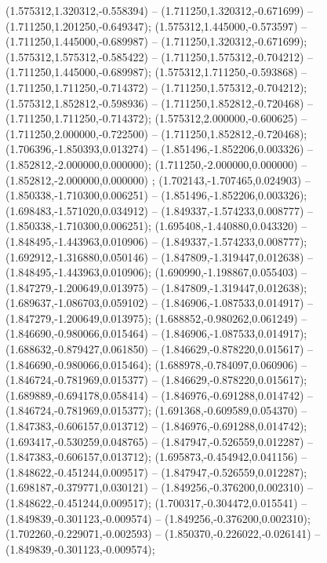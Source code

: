  (1.575312,1.320312,-0.558394) -- (1.711250,1.320312,-0.671699) -- (1.711250,1.201250,-0.649347);
 (1.575312,1.445000,-0.573597) -- (1.711250,1.445000,-0.689987) -- (1.711250,1.320312,-0.671699);
 (1.575312,1.575312,-0.585422) -- (1.711250,1.575312,-0.704212) -- (1.711250,1.445000,-0.689987);
 (1.575312,1.711250,-0.593868) -- (1.711250,1.711250,-0.714372) -- (1.711250,1.575312,-0.704212);
 (1.575312,1.852812,-0.598936) -- (1.711250,1.852812,-0.720468) -- (1.711250,1.711250,-0.714372);
 (1.575312,2.000000,-0.600625) -- (1.711250,2.000000,-0.722500) -- (1.711250,1.852812,-0.720468);
 (1.706396,-1.850393,0.013274) -- (1.851496,-1.852206,0.003326) -- (1.852812,-2.000000,0.000000);
 (1.711250,-2.000000,0.000000) -- (1.852812,-2.000000,0.000000) ;
 (1.702143,-1.707465,0.024903) -- (1.850338,-1.710300,0.006251) -- (1.851496,-1.852206,0.003326);
 (1.698483,-1.571020,0.034912) -- (1.849337,-1.574233,0.008777) -- (1.850338,-1.710300,0.006251);
 (1.695408,-1.440880,0.043320) -- (1.848495,-1.443963,0.010906) -- (1.849337,-1.574233,0.008777);
 (1.692912,-1.316880,0.050146) -- (1.847809,-1.319447,0.012638) -- (1.848495,-1.443963,0.010906);
 (1.690990,-1.198867,0.055403) -- (1.847279,-1.200649,0.013975) -- (1.847809,-1.319447,0.012638);
 (1.689637,-1.086703,0.059102) -- (1.846906,-1.087533,0.014917) -- (1.847279,-1.200649,0.013975);
 (1.688852,-0.980262,0.061249) -- (1.846690,-0.980066,0.015464) -- (1.846906,-1.087533,0.014917);
 (1.688632,-0.879427,0.061850) -- (1.846629,-0.878220,0.015617) -- (1.846690,-0.980066,0.015464);
 (1.688978,-0.784097,0.060906) -- (1.846724,-0.781969,0.015377) -- (1.846629,-0.878220,0.015617);
 (1.689889,-0.694178,0.058414) -- (1.846976,-0.691288,0.014742) -- (1.846724,-0.781969,0.015377);
 (1.691368,-0.609589,0.054370) -- (1.847383,-0.606157,0.013712) -- (1.846976,-0.691288,0.014742);
 (1.693417,-0.530259,0.048765) -- (1.847947,-0.526559,0.012287) -- (1.847383,-0.606157,0.013712);
 (1.695873,-0.454942,0.041156) -- (1.848622,-0.451244,0.009517) -- (1.847947,-0.526559,0.012287);
 (1.698187,-0.379771,0.030121) -- (1.849256,-0.376200,0.002310) -- (1.848622,-0.451244,0.009517);
 (1.700317,-0.304472,0.015541) -- (1.849839,-0.301123,-0.009574) -- (1.849256,-0.376200,0.002310);
 (1.702260,-0.229071,-0.002593) -- (1.850370,-0.226022,-0.026141) -- (1.849839,-0.301123,-0.009574);
